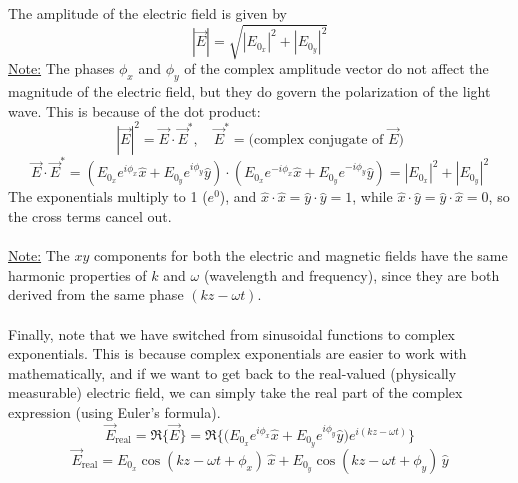 \documentclass[12pt]{article}
\begin{document}
The amplitude of the electric field is given by
\[|\vec{E}| = \sqrt{|E_{0_x}|^2 + |E_{0_y}|^2}\]
\underline{Note:} The phases $\phi_x$ and $\phi_y$ of the complex amplitude vector do not affect the magnitude of the electric field, but they do govern the polarization of the light wave. This is because of the dot product:
\[|\vec{E}|^2 = \vec{E}\cdot\vec{E}^*,\quad \vec{E}^*=\text{(complex conjugate of $\vec{E}$)}\]
\[\vec{E}\cdot\vec{E}^* = \left( E_{0_x} e^{i \phi_x} \hat{x} + E_{0_y} e^{i \phi_y} \hat{y} \right) \cdot \left( E_{0_x} e^{-i \phi_x} \hat{x} + E_{0_y} e^{-i \phi_y} \hat{y} \right) = |E_{0_x}|^2 + |E_{0_y}|^2\]
The exponentials multiply to 1 ($e^0$), and $\hat{x}\cdot\hat{x} = \hat{y}\cdot\hat{y} = 1$, while $\hat{x}\cdot\hat{y} = \hat{y}\cdot\hat{x} = 0$, so the cross terms cancel out.\\\\
\underline{Note:} The $xy$ components for both the electric and magnetic fields have the same harmonic properties of $k$ and $\omega$ (wavelength and frequency), since they are both derived from the same phase $(kz - \omega t)$.\\\\
Finally, note that we have switched from sinusoidal functions to complex exponentials. This is because complex exponentials are easier to work with mathematically, and if we want to get back to the real-valued (physically measurable) electric field, we can simply take the real part of the complex expression (using Euler's formula).
\[
\vec{E}_{\text{real}} = \Re\! \Big\{ \vec{E} \Big\} 
= \Re\! \Big\{ \big( E_{0_x} e^{i \phi_x} \hat{x} + E_{0_y} e^{i \phi_y} \hat{y} \big) e^{i (k z - \omega t)} \Big\}
\]
\[
\vec{E}_{\text{real}} = 
E_{0_x} \cos(k z - \omega t + \phi_x)\,\hat{x}
+ E_{0_y} \cos(k z - \omega t + \phi_y)\,\hat{y}
\]
\end{document}
